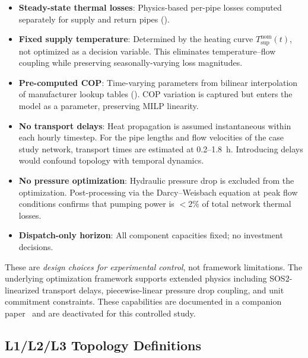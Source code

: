 \documentclass[review,3p]{elsarticle}
\begin{document}
\begin{itemize}
    \item \textbf{Steady-state thermal losses}: Physics-based per-pipe
    losses computed separately for supply and return pipes
    ().

    \item \textbf{Fixed supply temperature}: Determined by the
    heating curve $T_{\mathrm{sup}}^{\mathrm{nom}}(t)$, not optimized
    as a decision variable. This eliminates temperature--flow coupling
    while preserving seasonally-varying loss magnitudes.

    \item \textbf{Pre-computed COP}: Time-varying parameters from
    bilinear interpolation of manufacturer lookup tables
    (). COP variation is captured but enters the
    model as a parameter, preserving MILP linearity.

    \item \textbf{No transport delays}: Heat propagation is assumed
    instantaneous within each hourly timestep. For the pipe lengths
    and flow velocities of the case study network, transport times
    are estimated at 0.2--1.8~h. Introducing delays would confound
    topology with temporal dynamics.

    \item \textbf{No pressure optimization}: Hydraulic pressure drop
    is excluded from the optimization. Post-processing via the
    Darcy--Weisbach equation at peak flow conditions confirms that
    pumping power is $<$2\% of total network thermal losses.

    \item \textbf{Dispatch-only horizon}: All component capacities
    fixed; no investment decisions.
\end{itemize}

These are \emph{design choices for experimental control}, not
framework limitations. The underlying optimization framework supports
extended physics including SOS2-linearized transport delays,
piecewise-linear pressure drop coupling, and unit commitment
constraints. These capabilities are documented in a companion
paper~\cite{Paper2_CALION} and are deactivated for this controlled
study.

\subsection{L1/L2/L3 Topology Definitions}
\label{sec:topology_def}
\end{document}

